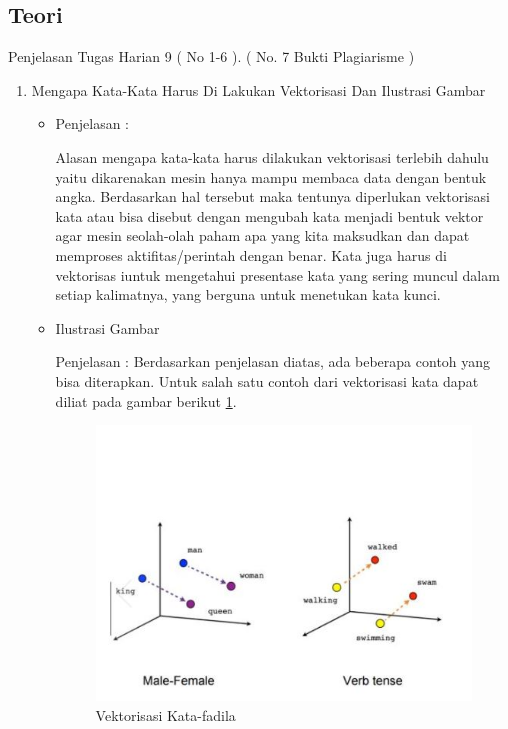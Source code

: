 \subsection{Teori}
Penjelasan Tugas Harian 9 ( No 1-6 ). ( No. 7 Bukti Plagiarisme )
\begin{enumerate}
\item Mengapa Kata-Kata Harus Di Lakukan Vektorisasi Dan Ilustrasi Gambar
\begin{itemize}
\item Penjelasan :
\par Alasan mengapa kata-kata harus dilakukan vektorisasi terlebih dahulu yaitu dikarenakan mesin hanya mampu membaca data dengan bentuk angka. Berdasarkan hal tersebut maka tentunya diperlukan vektorisasi kata atau bisa disebut dengan mengubah kata menjadi bentuk vektor agar mesin seolah-olah paham apa yang kita maksudkan dan dapat memproses aktifitas/perintah dengan benar. Kata juga harus di vektorisas iuntuk mengetahui presentase kata yang sering muncul dalam setiap kalimatnya, yang berguna untuk menetukan kata kunci.
\par
\item Ilustrasi Gambar
\par Penjelasan : Berdasarkan penjelasan diatas, ada beberapa contoh yang bisa diterapkan. Untuk salah satu contoh dari vektorisasi kata dapat diliat pada gambar berikut \ref{Vektorisasi Kata-fadila}.
\begin{figure}[!hbtp]
\centering
\includegraphics[scale=0.2]{figures/word-vec-fadila.jpg}
\caption{Vektorisasi Kata-fadila}
\label{Vektorisasi Kata-fadila}
\end{figure}
\par

\end{itemize}
\end{enumerate}
